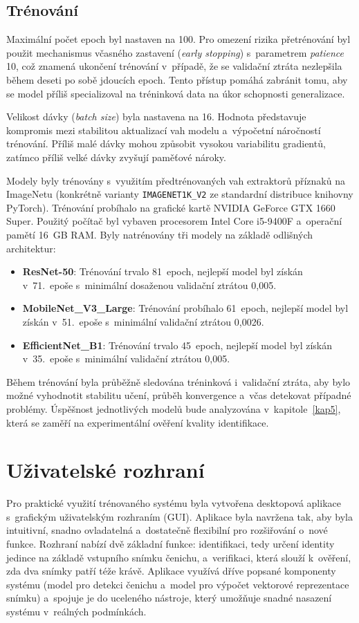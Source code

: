 \subsection*{Trénování}
Maximální počet epoch byl nastaven na 100. Pro omezení rizika přetrénování byl použit mechanismus včasného zastavení (\textit{early stopping}) s~parametrem \textit{patience} 10, což znamená ukončení trénování v~případě, že se validační ztráta nezlepšila během deseti po sobě jdoucích epoch. Tento přístup pomáhá zabránit tomu, aby se model příliš specializoval na tréninková data na úkor schopnosti generalizace.

Velikost dávky (\textit{batch size}) byla nastavena na 16. Hodnota představuje kompromis mezi stabilitou aktualizací vah modelu a~výpočetní náročností trénování. Příliš malé dávky mohou způsobit vysokou variabilitu gradientů, zatímco příliš velké dávky zvyšují paměťové nároky.

Modely byly trénovány s~využitím předtrénovaných vah extraktorů příznaků na ImageNetu (konkrétně varianty \texttt{IMAGENET1K\_V2} ze standardní distribuce knihovny PyTorch). Trénování probíhalo na grafické kartě NVIDIA GeForce GTX 1660 Super. Použitý počítač byl vybaven procesorem Intel Core i5-9400F a~operační pamětí 16~GB RAM.
Byly natrénovány tři modely na základě odlišných architektur: 
\begin{itemize} 
	\item \textbf{ResNet-50}: Trénování trvalo 81~epoch, nejlepší model byl získán v~71.~epoše s~minimální dosaženou validační ztrátou 0,005. 
	\item \textbf{MobileNet\_V3\_Large}: Trénování probíhalo 61~epoch, nejlepší model byl získán v~51.~epoše s~minimální validační ztrátou 0,0026. 
	\item \textbf{EfficientNet\_B1}: Trénování trvalo 45~epoch, nejlepší model byl získán v~35.~epoše s~minimální validační ztrátou 0,005. \end{itemize}

Během trénování byla průběžně sledována tréninková i~validační ztráta, aby bylo možné vyhodnotit stabilitu učení, průběh konvergence a~včas detekovat případné problémy. Úspěšnost jednotlivých modelů bude analyzována v~kapitole~\ref{kap5}, která se zaměří na experimentální ověření kvality identifikace.


\section{Uživatelské rozhraní}
\label{gui}
Pro praktické využití trénovaného systému byla vytvořena desktopová aplikace s~grafickým uživatelským rozhraním (GUI). Aplikace byla navržena tak, aby byla intuitivní, snadno ovladatelná a~dostatečně flexibilní pro rozšiřování o~nové funkce. Rozhraní nabízí dvě základní funkce: identifikaci, tedy určení identity jedince na základě vstupního snímku čenichu, a~verifikaci, která slouží k~ověření, zda dva snímky patří téže krávě. Aplikace využívá dříve popsané komponenty systému (model pro detekci čenichu a~model pro výpočet vektorové reprezentace snímku) a~spojuje je do uceleného nástroje, který umožňuje snadné nasazení systému v~reálných podmínkách.

